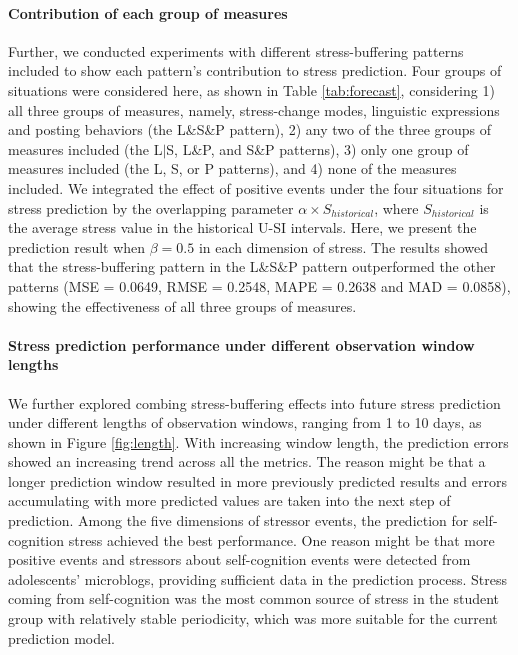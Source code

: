 \paragraph{Contribution of each group of measures}
Further,
we conducted experiments with different stress-buffering patterns included to show each pattern's contribution to stress prediction. 
Four groups of situations were considered here, as shown in Table \ref{tab:forecast},
considering
1) all three groups of measures, namely, stress-change modes, linguistic expressions and posting behaviors (the L\&S\&P pattern),
2) any two of the three groups of measures included (the L$|$S, L\&P, and S\&P patterns),
3) only one group of measures included (the L, S, or P patterns),
and 4) none of the measures included.
We integrated the effect of positive events under the four situations for stress prediction
by the overlapping parameter $\alpha \times S_{historical}$,
where $S_{historical}$ is the average stress value in the historical U-SI intervals.
Here, we present the prediction result when $\beta = 0.5$ in each dimension of stress.
The results showed that the stress-buffering pattern in the L\&S\&P pattern outperformed the other patterns 
(MSE = 0.0649, RMSE = 0.2548, MAPE = 0.2638 and MAD = 0.0858),
showing the effectiveness of all three groups of measures. 


\paragraph{Stress prediction performance under different observation window lengths} 
We further explored combing stress-buffering effects into future stress prediction under different lengths of observation windows,
ranging from 1 to 10 days, as shown in Figure \ref{fig:length}.
With increasing window length,
the prediction errors showed an increasing trend across all the metrics.
The reason might be that a longer prediction window resulted in more previously predicted results
and errors accumulating with more predicted values are taken into the next step of prediction.
Among the five dimensions of stressor events,
the prediction for self-cognition stress achieved the best performance.
One reason might be that more positive events and stressors about self-cognition events were detected from adolescents' microblogs, 
providing sufficient data in the prediction process. 
Stress coming from self-cognition was the most common source of stress in the student group with relatively stable periodicity, 
which was more suitable for the current prediction model. 

